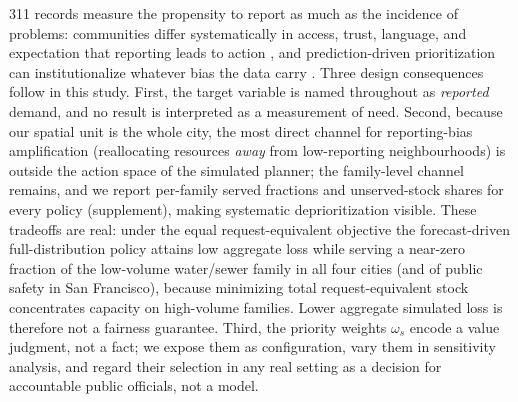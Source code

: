 311 records measure the propensity to report as much as the incidence of
problems: communities differ systematically in access, trust, language,
and expectation that reporting leads to action
\citep{kontokosta2017equity, kontokosta2021bias}, and prediction-driven
prioritization can institutionalize whatever bias the data carry
\citep{samorani2022overbooked}. Three design consequences follow in this
study. First, the target variable is named throughout as \emph{reported}
demand, and no result is interpreted as a measurement of need. Second,
because our spatial unit is the whole city, the most direct channel for
reporting-bias amplification (reallocating resources \emph{away} from
low-reporting neighbourhoods) is outside the action space of the
simulated planner; the family-level channel remains, and we report
per-family served fractions and unserved-stock shares for every policy
(supplement), making systematic deprioritization visible. These tradeoffs are real: under
the equal request-equivalent objective the forecast-driven
full-distribution policy attains low aggregate loss while serving a
near-zero fraction of the low-volume water/sewer family in all four cities
(and of public safety in San Francisco), because minimizing total
request-equivalent stock concentrates capacity on high-volume families.
Lower aggregate simulated loss is therefore not a fairness guarantee.
Third, the priority weights $\omega_s$ encode a value judgment, not a
fact; we expose them as configuration, vary them in sensitivity analysis,
and regard their selection in any real setting as a decision for
accountable public officials, not a model.
